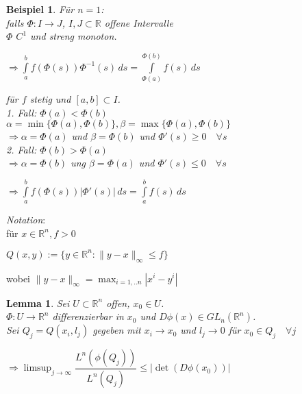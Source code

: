 \documentclass[11pt]{memoir}
\theoremstyle{changebreak}
\newtheorem{Beispiel}{Beispiel}[chapter]
\newtheorem{Lemma}{Lemma}[chapter]
\begin{document}
\begin{Beispiel}
Für $n = 1$: \\
falls $\Phi: I \rightarrow J$, $I, J \subset \mathbb R$ offene Intervalle \\
$\Phi$ $C^1$ und streng monoton. \\
\begin{center}
	$\Rightarrow \int\limits_a^b f\left(\Phi(s)\right) \Phi^{-1}(s) \, ds = \int\limits_{\Phi(a)}^{\Phi(b)} f(s) \, ds$
\end{center}
für $f$ stetig und $[a, b] \subset I$. \\

\emph{1. Fall}: $\Phi(a) < \Phi(b)$ \\
$\alpha = \min{\{\Phi(a), \Phi(b)\}}, \beta = \max{\{\Phi(a), \Phi(b)\}} $ \\
$\Rightarrow \alpha = \Phi(a)$ und $\beta = \Phi(b)$ und $\Phi'(s) \geq 0\quad \forall s$ \\

\emph{2. Fall}: $\Phi(b) > \Phi(a)$ \\
$\Rightarrow \alpha= \Phi(b)$ ung $\beta = \Phi(a)$ und $\Phi'(s) \leq 0\quad \forall s$
\begin{center}
	$\Rightarrow \int\limits_a^b f(\Phi(s))|\Phi'(s)|\, ds = \int\limits_a^b f(s)\, ds$
\end{center}
\end{Beispiel}

\emph{Notation}: \\
für $x \in \mathbb R^n, f > 0$ \\
\begin{center}
	$Q(x, y) := \{y \in \mathbb R^n: \|y-x\|_\infty \leq f\}$
\end{center}
wobei $\|y-x\|_\infty = \max_{i = 1, .. n} |x^{i} - y^{i}|$


\begin{Lemma}
Sei $U \subset \mathbb R^n$ offen, $x_0 \in U$. \\
$\Phi: U \rightarrow \mathbb R^n$ differenzierbar in $x_0$ und $D\phi(x) \in GL_n(\mathbb R^n)$. \\
Sei $Q_j = Q(x_i, l_j)$ gegeben mit $x_i \rightarrow x_0$ und $l_j \rightarrow 0$ für $x_0 \in Q_j\quad \forall j$
\begin{center}
	$\Rightarrow  \limsup_{j \rightarrow \infty} \dfrac{L^n(\phi(Q_j))}{L^n(Q_j)} \leq \left| \det (D\phi(x_0))\right|$
\end{center}
\end{Lemma}
\end{document}
